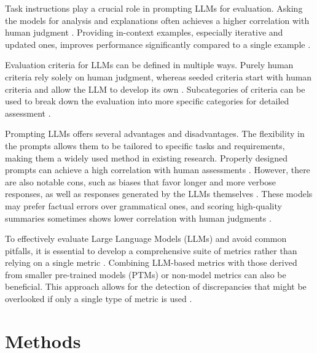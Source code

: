 \documentclass[preprint,12pt]{elsarticle}
\begin{document}
Task instructions play a crucial role in prompting LLMs for evaluation. Asking the models for analysis and explanations often achieves a higher correlation with human judgment \cite{Gao2024}. Providing in-context examples, especially iterative and updated ones, improves performance significantly compared to a single example \cite{Gao2024}.

Evaluation criteria for LLMs can be defined in multiple ways. Purely human criteria rely solely on human judgment, whereas seeded criteria start with human criteria and allow the LLM to develop its own \cite{Gao2024}. Subcategories of criteria can be used to break down the evaluation into more specific categories for detailed assessment \cite{Gao2024}.

Prompting LLMs offers several advantages and disadvantages. The flexibility in the prompts allows them to be tailored to specific tasks and requirements, making them a widely used method in existing research. Properly designed prompts can achieve a high correlation with human assessments \cite{Gao2024}. However, there are also notable cons, such as biases that favor longer and more verbose responses, as well as responses generated by the LLMs themselves \cite{Gao2024}. These models may prefer factual errors over grammatical ones, and scoring high-quality summaries sometimes shows lower correlation with human judgments \cite{Gao2024}.

To effectively evaluate Large Language Models (LLMs) and avoid common pitfalls, it is essential to develop a comprehensive suite of metrics rather than relying on a single metric \cite{vanSchaik2024}.
Combining LLM-based metrics with those derived from smaller pre-trained models (PTMs) or non-model metrics can also be beneficial. This approach allows for the detection of discrepancies that might be overlooked if only a single type of metric is used \cite{vanSchaik2024}.



\section{Methods}
\label{sec3}
\end{document}
